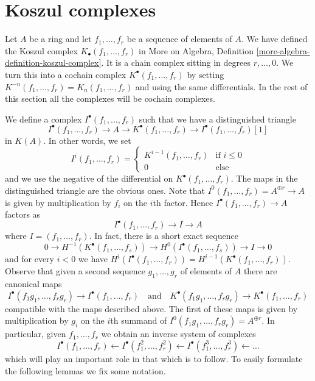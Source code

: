 \section{Koszul complexes}
\label{perfect-section-koszul}
Let $A$ be a ring and let $f_1, \ldots, f_r$ be a sequence of elements
of $A$. We have defined the Koszul complex
$K_\bullet(f_1, \ldots, f_r)$ in
More on Algebra, Definition \ref{more-algebra-definition-koszul-complex}.
It is a chain complex sitting in degrees $r, \ldots, 0$.
We turn this into a cochain complex $K^\bullet(f_1, \ldots, f_r)$
by setting $K^{-n}(f_1, \ldots, f_r) = K_n(f_1, \ldots, f_r)$
and using the same differentials. In the rest of this section all
the complexes will be cochain complexes.

\medskip\noindent
We define a complex $I^\bullet(f_1, \ldots, f_r)$
such that we have a distinguished triangle
$$
I^\bullet(f_1, \ldots, f_r) \to
A \to
K^\bullet(f_1, \ldots, f_r) \to
I^\bullet(f_1, \ldots, f_r)[1]
$$
in $K(A)$.
In other words, we set
$$
I^i(f_1, \ldots, f_r) =
\left\{
\begin{matrix}
K^{i - 1}(f_1, \ldots, f_r) & \text{if } i \leq 0 \\
0 & \text{else}
\end{matrix}
\right.
$$
and we use the negative of the differential on $K^\bullet(f_1, \ldots, f_r)$.
The maps in the distinguished triangle are the obvious ones. Note that
$I^0(f_1, \ldots, f_r) = A^{\oplus r} \to A$ is given by
multiplication by $f_i$ on the $i$th factor.
Hence $I^\bullet(f_1, \ldots, f_r) \to A$ factors as
$$
I^\bullet(f_1, \ldots, f_r) \to I \to A
$$
where $I = (f_1, \ldots, f_r)$. In fact, there is a short exact sequence
$$
0 \to H^{-1}(K^\bullet(f_1, \ldots, f_s)) \to
H^0(I^\bullet(f_1, \ldots, f_s)) \to I \to 0
$$
and for every $i < 0$ we have
$H^i(I^\bullet(f_1, \ldots, f_r)) = H^{i - 1}(K^\bullet(f_1, \ldots, f_r))$.
Observe that given a second sequence $g_1, \ldots, g_r$ of elements of $A$
there are canonical maps
$$
I^\bullet(f_1g_1, \ldots, f_rg_r) \to I^\bullet(f_1, \ldots, f_r)
\quad\text{and}\quad
K^\bullet(f_1g_1, \ldots, f_rg_r) \to K^\bullet(f_1, \ldots, f_r)
$$
compatible with the maps described above. The first of these maps is
given by multiplication by $g_i$ on the $i$th summand of
$I^0(f_1g_1, \ldots, f_rg_r) = A^{\oplus r}$. In particular, given
$f_1, \ldots, f_r$ we obtain an inverse system of complexes
\begin{equation}
\label{equation-system}
I^\bullet(f_1, \ldots, f_r) \leftarrow
I^\bullet(f_1^2, \ldots, f_r^2) \leftarrow
I^\bullet(f_1^3, \ldots, f_r^3) \leftarrow \ldots
\end{equation}
which will play an important role in that which is to follow.
To easily formulate the following lemmas we fix some notation.

